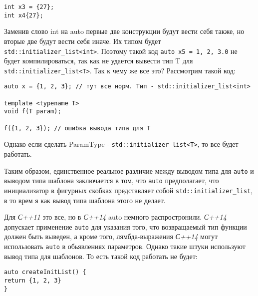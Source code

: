 \begin{verbatim}
int x3 = {27};
int x4{27};
\end{verbatim}
	
	Заменив слово int на auto первые две конструкции будут вести себя также, но вторые две будут вести себя иначе. Их типом будет \texttt{std::initializer_list<int>}. Поэтому такой код \texttt{auto x5 = {1, 2, 3.0}} не будет компилироваться, так как не удается вывести тип T для \texttt{std::initializer_list<T>}. Так к чему же все это? Рассмотрим такой код:
	
\begin{verbatim}
auto x = {1, 2, 3}; // тут все норм. Тип - std::initializer_list<int>

template <typename T>
void f(T param);

f({1, 2, 3}); // ошибка вывода типа для T
\end{verbatim}
	
	Однако если сделать ParamType - \texttt{std::initializer_list<T>}, то все будет работать.
	
	Таким образом, единственное реальное различие между выводом типа для \texttt{auto} и выводом типа шаблона заключается в том, что \texttt{auto} предполагает, что инициализатор в фигурных скобках представляет собой \texttt{std::initializer_list}, в то врем я как вывод типа шаблона этого не делает.
	
	Для \textit{С++11} это все, но в \textit{С++14} auto немного распростронили.\textit{ С++14 }допускает применение \texttt{auto} для указания того, что возвращаемый тип функции должен быть выведен, а кроме того, лямбда-выражения \textit{С++14} могут использовать \texttt{auto} в обьявлениях параметров. Однако такие штуки используют вывод типа для шаблонов. То есть такой код работать не будет:
\begin{verbatim}
auto createInitList() {
return {1, 2, 3}
}
\end{verbatim}
	
